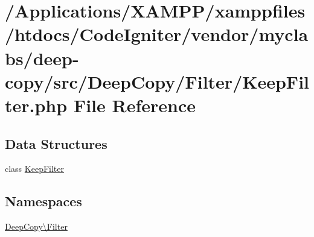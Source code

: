 \hypertarget{_keep_filter_8php}{}\section{/\+Applications/\+X\+A\+M\+P\+P/xamppfiles/htdocs/\+Code\+Igniter/vendor/myclabs/deep-\/copy/src/\+Deep\+Copy/\+Filter/\+Keep\+Filter.php File Reference}
\label{_keep_filter_8php}
\subsection*{Data Structures}
\begin{DoxyCompactItemize}
\item 
class \mbox{\hyperlink{class_deep_copy_1_1_filter_1_1_keep_filter}{Keep\+Filter}}
\end{DoxyCompactItemize}
\subsection*{Namespaces}
\begin{DoxyCompactItemize}
\item 
 \mbox{\hyperlink{namespace_deep_copy_1_1_filter}{Deep\+Copy\textbackslash{}\+Filter}}
\end{DoxyCompactItemize}
